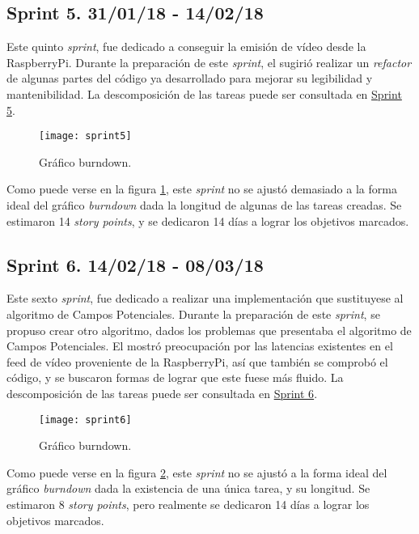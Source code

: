 \subsection{Sprint 5. 31/01/18 - 14/02/18}

Este quinto \emph{sprint}, fue dedicado a conseguir la emisión de vídeo desde la RaspberryPi.
Durante la preparación de este \emph{sprint}, el \cotutorOne{} sugirió realizar un \emph{refactor} de algunas partes del código ya desarrollado para mejorar su legibilidad y mantenibilidad.
La descomposición de las tareas puede ser consultada en \href{https://github.com/mbm0089/gii_0_17.02_snsi/milestone/5?closed=1}{Sprint 5}.

\begin{figure}[H]
	\centering
	\texttt{[image: sprint5]}
	\caption[Burndown Sprint 5]{Gráfico burndown.}\label{fig:sprint5}
\end{figure}

Como puede verse en la figura \ref{fig:sprint5}, este \emph{sprint} no se ajustó demasiado a la forma ideal del gráfico \emph{burndown} dada la longitud de algunas de las tareas creadas.
Se estimaron 14 \emph{story points}, y se dedicaron 14 días a lograr los objetivos marcados.

\subsection{Sprint 6. 14/02/18 - 08/03/18}

Este sexto \emph{sprint}, fue dedicado a realizar una implementación que sustituyese al algoritmo de Campos Potenciales.
Durante la preparación de este \emph{sprint}, se propuso crear otro algoritmo, dados los problemas que presentaba el algoritmo de Campos Potenciales. El \cotutorOne{} mostró preocupación por las latencias existentes en el feed de vídeo proveniente de la RaspberryPi, así que también se comprobó el código, y se buscaron formas de lograr que este fuese más fluido.
La descomposición de las tareas puede ser consultada en \href{https://github.com/mbm0089/gii_0_17.02_snsi/milestone/6?closed=1}{Sprint 6}.

\begin{figure}[H]
	\centering
	\texttt{[image: sprint6]}
	\caption[Burndown Sprint 6]{Gráfico burndown.}\label{fig:sprint6}
\end{figure}

Como puede verse en la figura \ref{fig:sprint6}, este \emph{sprint} no se ajustó a la forma ideal del gráfico \emph{burndown} dada la existencia de una única tarea, y su longitud.
Se estimaron 8 \emph{story points}, pero realmente se dedicaron 14 días a lograr los objetivos marcados.

